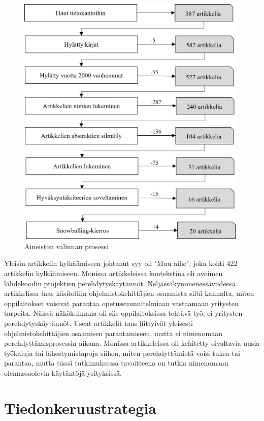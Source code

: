 \documentclass[utf8]{gradu3}
\begin{document}
\begin{figure}[h]
    \centering
    \includegraphics[width=11cm]{media/aineiston-rajaaminen-laaja-vaakalinja.png}
    \caption{Aineiston valinnan prosessi}
    \label{kuvio:aineiston-rajaaminen-laaja}
\end{figure}

Yleisin artikkelin hylkäämiseen johtanut syy oli "Muu aihe", joka kohti 422 artikkelin hylkäämiseen. Monissa artikkeleissa kontekstina oli avoimen lähdekoodin projektien perehdytyskäytännöt. Neljässäkymmenessäviidessä artikkelissa taas käsiteltiin ohjelmistokehittäjien osaamista siltä kannalta, miten oppilaitokset voisivat parantaa opetussuunnitelmiaan vastaamaan yritysten tarpeita. Näissä näkökulmana oli siis oppilaitoksissa tehtävä työ, ei yritysten perehdytyskäytännöt. Useat artikkelit taas liittyivät yleisesti ohjelmistokehittäjien osaamisen parantamiseen, mutta ei nimenomaan perehdyttämisprosessin aikana. Monissa artikkeleissa oli kehitetty oivaltavia uusia työkaluja tai lähestymistapoja siihen, miten perehdyttämistä voisi tukea tai parantaa, mutta tässä tutkimuksessa tavoitteena on tutkia nimenomaan olemassaolevia käytäntöjä yrityksissä.

\section{Tiedonkeruustrategia}
\label{luku-tiedonkeruustrategia}
\end{document}
